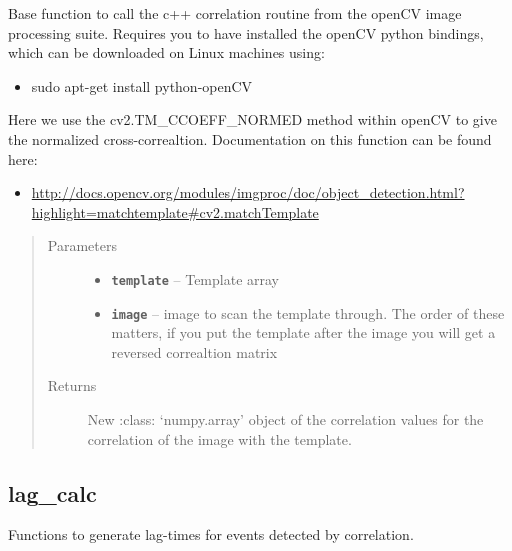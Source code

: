 \documentclass[a4paper,10pt,english]{sphinxmanual}
\begin{document}
\begin{fulllineitems}
\label{core:match_filter.normxcorr2}
Base function to call the c++ correlation routine from the openCV image
processing suite.  Requires you to have installed the openCV python
bindings, which can be downloaded on Linux machines using:
\begin{itemize}
\item {} 
sudo apt-get install python-openCV

\end{itemize}

Here we use the cv2.TM\_CCOEFF\_NORMED method within openCV to give the
normalized cross-correaltion.  Documentation on this function can be
found here:
\begin{itemize}
\item {} 
\href{http://docs.opencv.org/modules/imgproc/doc/object\_detection.html?highlight=matchtemplate\#cv2.matchTemplate}{http://docs.opencv.org/modules/imgproc/doc/object\_detection.html?highlight=matchtemplate\#cv2.matchTemplate}

\end{itemize}
\begin{quote}\begin{description}
\item[{Parameters}] \leavevmode\begin{itemize}
\item {} 
\textbf{\texttt{template}} -- Template array

\item {} 
\textbf{\texttt{image}} -- image to scan    the template through.  The order of these matters, if you put the template    after the image you will get a reversed correaltion matrix

\end{itemize}

\item[{Returns}] \leavevmode
New :class: `numpy.array' object of the correlation values for the    correlation of the image with the template.

\end{description}\end{quote}

\end{fulllineitems}



\subsection{lag\_calc}
\label{core:lag-calc}\label{core:module-lag_calc}
Functions to generate lag-times for events detected by correlation.
\end{document}
